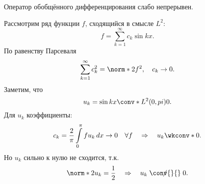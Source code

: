 \begin{lemma} Оператор обобщённого дифференцирования слабо непрерывен.
\end{lemma}

\begin{example} Рассмотрим ряд функции $f$, сходящийся в смысле $L^2$:
$$ f = \sum_{k=1}^\infty c_k \sin kx.$$
По равенству Парсеваля
$$ \sum_{k=1}^\infty c_k^2 = \norm*{2}{f}^2, \quad c_k \to 0.$$
Заметим, что $$u_k = \sin kx \conv*{L^2(0,pi)}{} 0.$$
Для $u_k$ коэффициенты:
$$ c_k = \frac {2} {\pi} \int \limits_0^\pi f u_k \, dx \to 0 \quad \forall f \quad \Rightarrow \quad u_k \wkconv*{}{} 0.$$
Но $u_k$ сильно к нулю не сходится, т.к.
$$ \norm*{2}{u_k} = \frac {1} {2} \quad \Rightarrow \quad u_k \centernot{\conv{}{}} 0.$$
\end{example}

